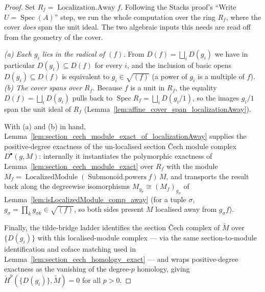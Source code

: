 \begin{proof}
  Set \(R_f = \operatorname{Localization.Away} f\). Following the Stacks proof's ``Write
  \(U = \operatorname{Spec}(A)\)'' step, we run the whole computation over the ring \(R_f\), where the
  cover \emph{does} span the unit ideal. The two algebraic inputs this needs are read off from the
  geometry of the cover.

  \emph{(a) Each \(g_i\) lies in the radical of \((f)\).} From \(D(f) = \bigsqcup_i D(g_i)\) we have in
  particular \(D(g_i) \subseteq D(f)\) for every \(i\), and the inclusion of basic opens
  \(D(g_i) \subseteq D(f)\) is equivalent to \(g_i \in \sqrt{(f)}\) (a power of \(g_i\) is a multiple of
  \(f\)). \emph{(b) The cover spans over \(R_f\).} Because \(f\) is a unit in \(R_f\), the equality
  \(D(f) = \bigsqcup_i D(g_i)\) pulls back to \(\operatorname{Spec} R_f = \bigsqcup_i D(g_i/1)\), so the
  images \(g_i/1\) span the unit ideal of \(R_f\) (Lemma~\ref{lem:affine_cover_span_localizationAway}).

  With (a) and (b) in hand, Lemma~\ref{lem:section_cech_module_exact_of_localizationAway} supplies the
  positive-degree exactness of the un-localised section {\v C}ech module complex \(D^\bullet(g, M)\):
  internally it instantiates the polymorphic exactness of
  Lemma~\ref{lem:section_cech_module_exact} over \(R_f\) with the module
  \(M_f = \operatorname{LocalizedModule}(\operatorname{Submonoid.powers} f)\, M\), and transports the
  result back along the degreewise isomorphisms \(M_{g_\sigma} \cong (M_f)_{g_\sigma}\) of
  Lemma~\ref{lem:isLocalizedModule_comp_away} (for a tuple \(\sigma\), \(g_\sigma = \prod_k g_{\sigma k}
  \in \sqrt{(f)}\), so both sides present \(M\) localised away from \(g_\sigma f\)).

  Finally, the tilde-bridge ladder identifies the section {\v C}ech complex of \(\widetilde{M}\) over
  \(\{D(g_i)\}\) with this localised-module complex --- via the same section-to-module identification
  and coface matching used in Lemma~\ref{lem:section_cech_homology_exact} --- and wraps positive-degree
  exactness as the vanishing of the degree-\(p\) homology, giving
  \(\check{H}^p(\{D(g_i)\}, \widetilde{M}) = 0\) for all \(p > 0\).
\end{proof}

